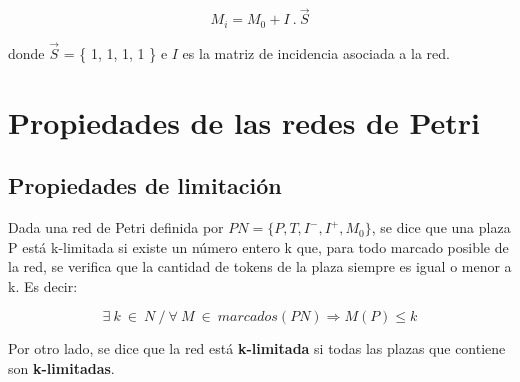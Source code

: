 \begin{equation}
    M_i = M_0 + I \ . \ \vec{S}
\end{equation}

\noindent donde $\vec{S}$ = \{ 1, 1, 1, 1 \} e $I$ es la matriz de incidencia asociada a la red.

\section{Propiedades de las redes de Petri} \label{sec:gestionred}
\subsection{Propiedades de limitación}
Dada una red de Petri definida por $PN = \{ P, T, I^-, I^+, M_0 \}$, se dice que una plaza P está k-limitada si existe un número entero k que, para todo marcado posible de la red, se verifica que la cantidad de tokens de la plaza siempre es igual o menor a k. Es decir:


\begin{equation}
    \exists \ k \ \in \ N \ / \ \forall \ M \ \in \ marcados (PN) \Rightarrow M(P) \leq k
\end{equation}

\noindent Por otro lado, se dice que la red está \textbf{k-limitada} si todas las plazas que contiene son \textbf{k-limitadas}. \\ \par

